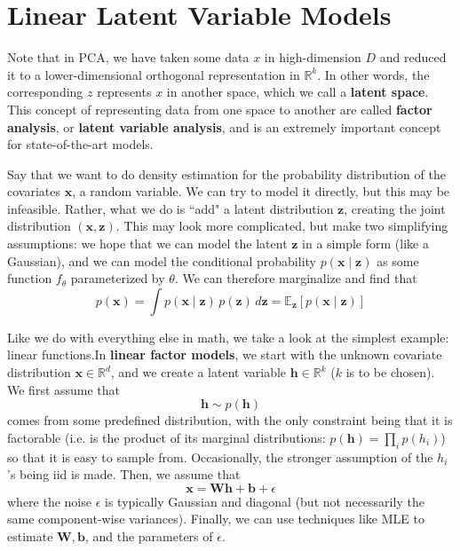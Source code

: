 \section{Linear Latent Variable Models}

  Note that in PCA, we have taken some data $x$ in high-dimension $D$ and reduced it to a lower-dimensional orthogonal representation in $\mathbb{R}^k$. In other words, the corresponding $z$ represents $x$ in another space, which we call a \textbf{latent space}. This concept of representing data from one space to another are called \textbf{factor analysis}, or \textbf{latent variable analysis}, and is an extremely important concept for state-of-the-art models. 

  Say that we want to do density estimation for the probability distribution of the covariates $\mathbf{x}$, a random variable. We can try to model it directly, but this may be infeasible. Rather, what we do is ``add" a latent distribution $\mathbf{z}$, creating the joint distribution $(\mathbf{x}, \mathbf{z})$. This may look more complicated, but make two simplifying assumptions: we hope that we can model the latent $\mathbf{z}$ in a simple form (like a Gaussian), and we can model the conditional probability $p(\mathbf{x} \mid \mathbf{z})$ as some function $f_\theta$ parameterized by $\theta$. We can therefore marginalize and find that 
  \begin{equation} 
    p(\mathbf{x}) = \int p(\mathbf{x} \mid \mathbf{z}) \, p(\mathbf{z}) \,d\mathbf{z} = \mathbb{E}_\mathbf{z} [p(\mathbf{x} \mid \mathbf{z})] 
  \end{equation}

  Like we do with everything else in math, we take a look at the simplest example: linear functions.In \textbf{linear factor models}, we start with the unknown covariate distribution $\mathbf{x} \in \mathbb{R}^d$, and we create a latent variable $\mathbf{h} \in \mathbb{R}^k$ ($k$ is to be chosen). We first assume that 
  \begin{equation}
    \mathbf{h} \sim p(\mathbf{h})
  \end{equation}
  comes from some predefined distribution, with the only constraint being that it is factorable (i.e. is the product of its marginal distributions: $p(\mathbf{h}) = \prod_i p(h_i)$) so that it is easy to sample from. Occasionally, the stronger assumption of the $h_i$'s being iid is made. Then, we assume that 
  \begin{equation}
    \mathbf{x} = \mathbf{W} \mathbf{h} + \mathbf{b} + \epsilon
  \end{equation}
  where the noise $\epsilon$ is typically Gaussian and diagonal (but not necessarily the same component-wise variances). Finally, we can use techniques like MLE to estimate $\mathbf{W}, \mathbf{b}$, and the parameters of $\epsilon$.  

